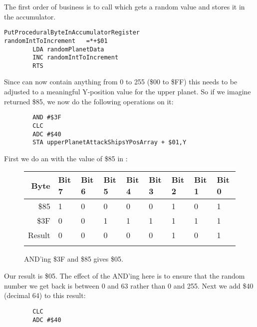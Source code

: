 The first order of business is to call  which gets a random value and stores it in the accumulator.

\begin{lstlisting}
PutProceduralByteInAccumulatorRegister
randomIntToIncrement   =*+$01
        LDA randomPlanetData
        INC randomIntToIncrement
        RTS
\end{lstlisting}

Since  can now contain anything from 0 to 255 (\$00 to \$FF) this needs to be adjusted to a meaningful Y-position
value for the upper planet. So if we imagine  returned \$85, we now do the
following operations on it:

\begin{lstlisting}
        AND #$3F
        CLC
        ADC #$40
        STA upperPlanetAttackShipsYPosArray + $01,Y
\end{lstlisting}

First we do an  with the value of \$85 in :
\begin{figure}[H]
  {
    \setlength{\tabcolsep}{3.0pt}
    \setlength\cmidrulewidth{\heavyrulewidth} %
    \begin{adjustbox}{width=10cm,center}

      \begin{tabular}{rllllllll}
        \toprule
        Byte & Bit 7 & Bit 6 & Bit 5 & Bit 4 & Bit 3 & Bit 2 & Bit 1 & Bit 0        \\
        \midrule
        \$85 & 1 & 0 & 0 & 0 & 0 & 1 & 0 & 1 \\
        \$3F & 0 & 0 & 1 & 1 & 1 & 1 & 1 & 1 \\
        \midrule
        Result & 0 & 0 & 0 & 0 & 0 & 1 & 0 & 1 \\
        \addlinespace
        \bottomrule
      \end{tabular}

    \end{adjustbox}

    }\caption*{AND'ing \$3F and \$85 gives \$05.}
\end{figure}

Our result is \$05. The effect of the AND'ing here is to ensure that the random number we get back is between 0 and 63 rather
than 0 and 255. Next we add \$40 (decimal 64) to this result:

\begin{lstlisting}
        CLC
        ADC #$40
\end{lstlisting}

